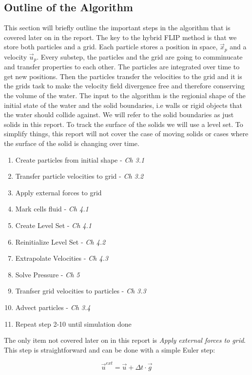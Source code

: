 \subsection{Outline of the Algorithm}

This section will briefly outline the important steps in the algorithm that is covered later on in the report. The key to the hybrid FLIP method is that we store both particles and a grid. Each particle stores a position in space, $\vec{x}_p$ and a velocity $\vec{u}_p$. Every substep, the particles and the grid are going to comminucate and transfer properties to each other. The particles are integrated over time to get new positions. Then the particles transfer the velocities to the grid and it is the grids task to make the velocity field divergence free and therefore conserving the volume of the water. The input to the algorithm is the regionial shape of the initial state of the water and the solid boundaries, i.e walls or rigid objects that the water should collide against. We will refer to the solid boundaries as just solids in this report. To track the surface of the solids we will use a level set. To simplify things, this report will not cover the case of moving solids or cases where the surface of the solid is changing over time.

\begin{enumerate}
\item Create particles from initial shape - \emph{Ch 3.1}
\item Transfer particle velocities to grid - \emph{Ch 3.2}
\item Apply external forces to grid
\item Mark cells fluid - \emph{Ch 4.1}
\item Create Level Set - \emph{Ch 4.1}
\item Reinitialize Level Set - \emph{Ch 4.2}
\item Extrapolate Velocities - \emph{Ch 4.3}
\item Solve Pressure - \emph{Ch 5}
\item Tranfser grid velocities to particles - \emph{Ch 3.3}
\item Advect particles - \emph{Ch 3.4}
\item Repeat step 2-10 until simulation done
\end{enumerate}

The only item not covered later on in this report is \emph{Apply external forces to grid}. This step is straightforward and can be done with a simple Euler step:

\begin{equation}
\vec{u}^{ext} = \vec{u} + \Delta t \cdot \vec{g}
\end{equation}

